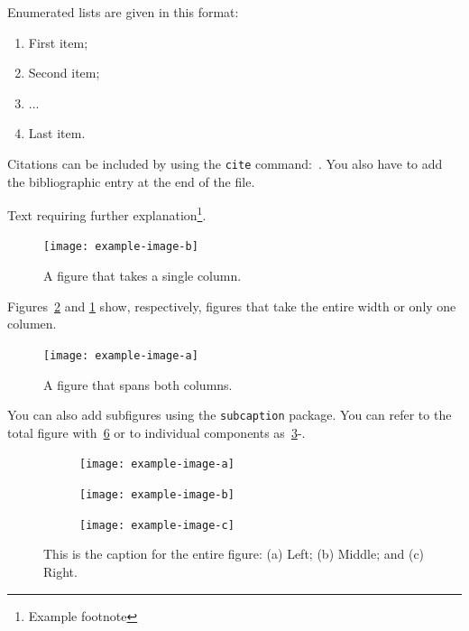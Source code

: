 \documentclass[twoside,twocolumn,10pt]{article}
\begin{document}
Enumerated lists are given in this format:
\begin{enumerate}
\item First item;
\item Second item;
\item ...
\item Last item.
\end{enumerate}

Citations can be included by using the \texttt{cite} command:~\cite{Figueredo:2009dg}. You also have to add the bibliographic entry at the end of the file.

Text requiring further explanation\footnote{Example footnote}.

\begin{figure}[!ht]
  \centering
  \texttt{[image: example-image-b]}
  \caption{A figure that takes a single column.}
  \label{fig:label_B}
\end{figure}


Figures~\ref{fig:label_A} and \ref{fig:label_B} show, respectively, figures that take the entire width or only one columen.

\begin{figure}
  \centering
  \texttt{[image: example-image-a]}
  \caption{A figure that spans both columns.}
  \label{fig:label_A}
\end{figure}

You can also add subfigures using the \texttt{subcaption} package. You can refer to the total figure with~\ref{fig:subfigures} or to individual components as~\ref{fig:subfigure_a}-.
\begin{figure}
  \begin{subfigure}[c]{0.32\textwidth}
    \texttt{[image: example-image-a]}
    \caption{}
    \label{fig:subfigure_a}
  \end{subfigure}
  \begin{subfigure}[c]{0.32\textwidth}
    \texttt{[image: example-image-b]}
    \caption{}
    \label{fig:subfigure_b}
  \end{subfigure}
  \begin{subfigure}[c]{0.32\textwidth}
    \texttt{[image: example-image-c]}
    \caption{}
    \label{fig:subfigure_c}
  \end{subfigure}
  \caption{This is the caption for the entire figure: (a) Left; (b) Middle; and (c) Right.}
  \label{fig:subfigures}  
\end{figure} 
\end{document}
